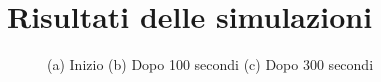 \section{Risultati delle simulazioni}\label{risultati}
\begin{figure}[ht]
    \centering
    \caption{(a) Inizio (b) Dopo 100 secondi (c) Dopo 300 secondi}\label{fig:sim1}
\end{figure}
